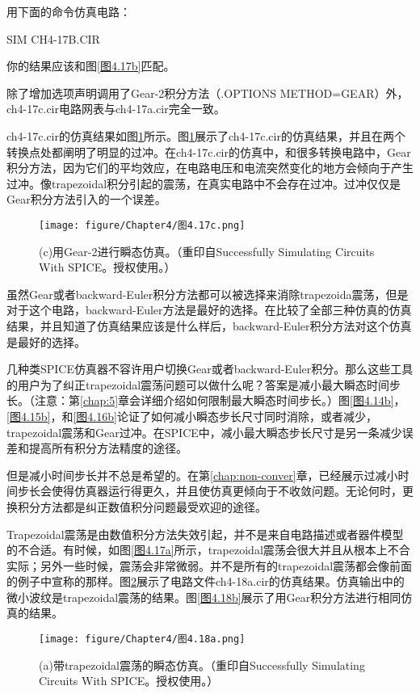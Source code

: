 用下面的命令仿真电路：

SIM CH4-17B.CIR

你的结果应该和图\ref{图4.17b}匹配。

除了增加选项声明调用了Gear-2积分方法（.OPTIONS METHOD=GEAR）外，ch4-17c.cir电路网表与ch4-17a.cir完全一致。

ch4-17c.cir的仿真结果如图\ref{图4.17c}所示。图\ref{图4.17c}展示了ch4-17c.cir的仿真结果，并且在两个转换点处都阐明了明显的过冲。在ch4-17c.cir的仿真中，和很多转换电路中，Gear积分方法，因为它们的平均效应，在电路电压和电流突然变化的地方会倾向于产生过冲。像trapezoidal积分引起的震荡，在真实电路中不会存在过冲。过冲仅仅是Gear积分方法引入的一个误差。
\begin{figure}[htbp]
\small
    \centering
    \texttt{[image: figure/Chapter4/图4.17c.png]}
    \caption{(c)用Gear-2进行瞬态仿真。（重印自Successfully Simulating Circuits With SPICE。授权使用。）}
    \label{图4.17c}
\end{figure}

虽然Gear或者backward-Euler积分方法都可以被选择来消除trapezoida震荡，但是对于这个电路，backward-Euler方法是最好的选择。在比较了全部三种仿真的仿真结果，并且知道了仿真结果应该是什么样后，backward-Euler积分方法对这个仿真是最好的选择。

几种类SPICE仿真器不容许用户切换Gear或者backward-Euler积分。那么这些工具的用户为了纠正trapezoidal震荡问题可以做什么呢？答案是减小最大瞬态时间步长。（注意：第\ref{chap:5}章会详细介绍如何限制最大瞬态时间步长。）图\ref{图4.14b}，\ref{图4.15b}，和\ref{图4.16b}论证了如何减小瞬态步长尺寸同时消除，或者减少，trapezoidal震荡和Gear过冲。在SPICE中，减小最大瞬态步长尺寸是另一条减少误差和提高所有积分方法精度的途径。

但是减小时间步长并不总是希望的。在第\ref{chap:non-conver}章，已经展示过减小时间步长会使得仿真器运行得更久，并且使仿真更倾向于不收敛问题。无论何时，更换积分方法都是纠正数值积分问题最受欢迎的途径。

Trapezoidal震荡是由数值积分方法失效引起，并不是来自电路描述或者器件模型的不合适。有时候，如图\ref{图4.17a}所示，trapezoidal震荡会很大并且从根本上不合实际；另外一些时候，震荡会非常微弱。并不是所有的trapezoidal震荡都会像前面的例子中宣称的那样。图\ref{图4.18a}展示了电路文件ch4-18a.cir的仿真结果。仿真输出中的微小波纹是trapezoidal震荡的结果。图\ref{图4.18b}展示了用Gear积分方法进行相同仿真的结果。

\begin{figure}[htbp]
\small
    \centering
    \texttt{[image: figure/Chapter4/图4.18a.png]}
    \caption{(a)带trapezoidal震荡的瞬态仿真。（重印自Successfully Simulating Circuits With SPICE。授权使用。）}
    \label{图4.18a}
\end{figure}


